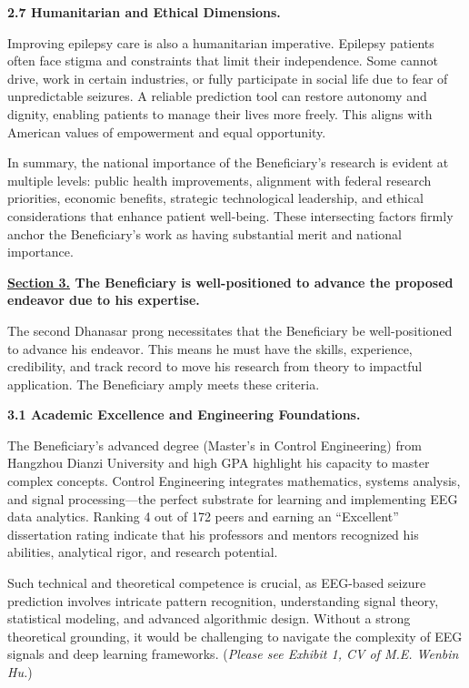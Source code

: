 \documentclass{article}
\begin{document}
{\bf 2.7 Humanitarian and Ethical Dimensions. }

Improving epilepsy care is also a humanitarian imperative. Epilepsy patients often face stigma and constraints that limit their independence. Some cannot drive, work in certain industries, or fully participate in social life due to fear of unpredictable seizures. A reliable prediction tool can restore autonomy and dignity, enabling patients to manage their lives more freely. This aligns with American values of empowerment and equal opportunity.

In summary, the national importance of the Beneficiary’s research is evident at multiple levels: public health improvements, alignment with federal research priorities, economic benefits, strategic technological leadership, and ethical considerations that enhance patient well-being. These intersecting factors firmly anchor the Beneficiary’s work as having substantial merit and national importance.


\clearpage

{\bf \underline{Section 3.} The Beneficiary is well-positioned to advance the proposed endeavor due to his expertise. }

The second Dhanasar prong necessitates that the Beneficiary be well-positioned to advance his endeavor. This means he must have the skills, experience, credibility, and track record to move his research from theory to impactful application. The Beneficiary amply meets these criteria.


{\bf 3.1 Academic Excellence and Engineering Foundations.}

The Beneficiary’s advanced degree (Master’s in Control Engineering) from Hangzhou Dianzi University and high GPA highlight his capacity to master complex concepts. Control Engineering integrates mathematics, systems analysis, and signal processing—the perfect substrate for learning and implementing EEG data analytics. Ranking 4 out of 172 peers and earning an “Excellent” dissertation rating indicate that his professors and mentors recognized his abilities, analytical rigor, and research potential.

Such technical and theoretical competence is crucial, as EEG-based seizure prediction involves intricate pattern recognition, understanding signal theory, statistical modeling, and advanced algorithmic design. Without a strong theoretical grounding, it would be challenging to navigate the complexity of EEG signals and deep learning frameworks. ({\it Please see Exhibit 1, CV of M.E. Wenbin Hu.}) 
\end{document}
